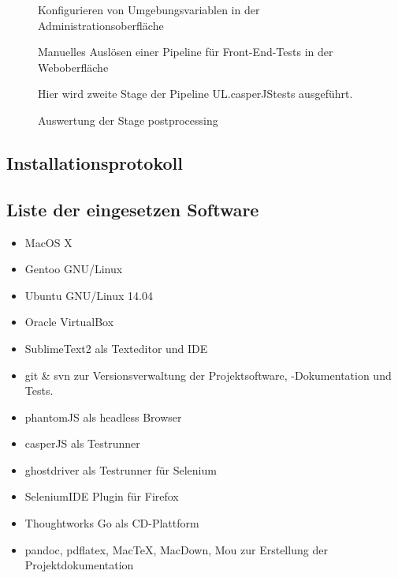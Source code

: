 \begin{figure}[htb]
\centering
{}
\caption{Konfigurieren von Umgebungsvariablen in der Administrationsoberfläche}
\label{fig:goguienvvars}
\end{figure}


 \begin{figure}[htb]
\centering
{}
\caption{Manuelles Auslösen einer Pipeline für Front-End-Tests in der Weboberfläche}
\label{fig:goguitrigger}
\end{figure}



\begin{figure}[htb]
\centering
{}
\caption{  Hier wird zweite Stage der Pipeline UL.casperJStests ausgeführt.}
\label{fig:goguistagedetail}
\end{figure}

\begin{figure}[htb]
\centering

\caption{Auswertung der Stage postprocessing }
\label{fig:goguisummary}
\end{figure}

\clearpage
  \subsection{Installationsprotokoll}\label{installprotocoll}
  
  \clearpage

\subsection{Liste der eingesetzen
Software}\label{liste-der-eingesetzen-software}

\begin{itemize}
\itemsep1pt\parskip0pt
\item
  MacOS X
\item
  Gentoo GNU/Linux
\item
  Ubuntu GNU/Linux 14.04
\item
  Oracle VirtualBox
\item
  SublimeText2 als Texteditor und \acs{IDE}
\item
  git \& svn zur Versionsverwaltung der Projektsoftware, -Dokumentation
  und Tests.
\item
  phantomJS als headless Browser
\item
  casperJS als Testrunner
\item
  ghostdriver als Testrunner für Selenium
\item
  SeleniumIDE Plugin für Firefox
\item
  Thoughtworks Go als CD-Plattform
\item
  pandoc, pdflatex, MacTeX, MacDown, Mou zur Erstellung der
  Projektdokumentation
\end{itemize}

